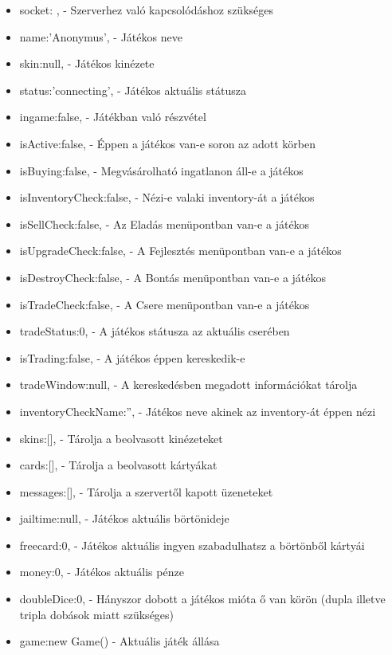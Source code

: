 \begin{itemize}
	\item socket: {}, - Szerverhez való kapcsolódáshoz szükséges
	\item name:'Anonymus', - Játékos neve
	\item skin:null, - Játékos kinézete
	\item status:'connecting', - Játékos aktuális státusza
	\item ingame:false, - Játékban való részvétel
	\item isActive:false, - Éppen a játékos van-e soron az adott körben
	\item isBuying:false, - Megvásárolható ingatlanon áll-e a játékos
	\item isInventoryCheck:false, - Nézi-e valaki inventory-át a játékos
	\item isSellCheck:false, - Az Eladás menüpontban van-e a játékos
	\item isUpgradeCheck:false, - A Fejlesztés menüpontban van-e a játékos
	\item isDestroyCheck:false, - A Bontás menüpontban van-e a játékos
	\item isTradeCheck:false, - A Csere menüpontban van-e a játékos
	\item tradeStatus:0, - A játékos státusza az aktuális cserében
	\item isTrading:false, - A játékos éppen kereskedik-e
	\item tradeWindow:null, - A kereskedésben megadott információkat tárolja
	\item inventoryCheckName:'', - Játékos neve akinek az inventory-át éppen nézi
	\item skins:[], - Tárolja a beolvasott kinézeteket
	\item cards:[], - Tárolja a beolvasott kártyákat
	\item messages:[], - Tárolja a szervertől kapott üzeneteket
	\item jailtime:null, - Játékos aktuális börtönideje
	\item freecard:0, - Játékos aktuális ingyen szabadulhatsz a börtönből kártyái
	\item money:0, - Játékos aktuális pénze
	\item doubleDice:0, - Hányszor dobott a játékos mióta ő van körön (dupla illetve tripla dobások miatt szükséges)
	\item game:new Game() - Aktuális játék állása
\end{itemize}

